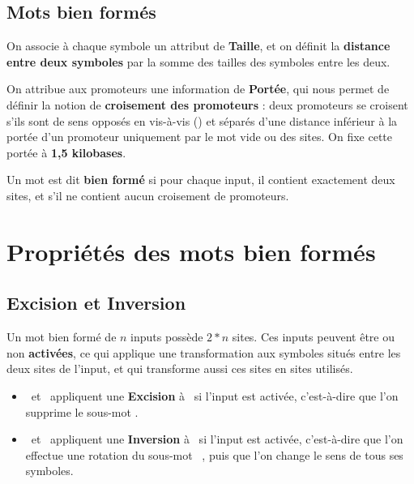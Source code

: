 \subsection{Mots bien formés}
\label{subsec:formalisme/definitions/mots_bien_formes}
\par
On associe à chaque symbole un attribut de \textbf{Taille}, et on définit la \textbf{distance entre deux symboles} par la somme des tailles des symboles entre les deux.\\
\par
On attribue aux promoteurs une information de \textbf{Portée}, qui nous permet de définir la notion de \textbf{croisement des promoteurs} : deux promoteurs se croisent s'ils sont de sens opposés en vis-à-vis (\PF \ANY \PR) et séparés d'une distance inférieur à la portée d'un promoteur uniquement par le mot vide ou des sites. On fixe cette portée à \textbf{1,5 kilobases}.
\par
Un mot est dit \textbf{bien formé} si pour chaque input, il contient exactement deux sites, et s'il ne contient aucun croisement de promoteurs.\\

\section{Propriétés des mots bien formés}
\label{sec:formalisme/proprietes}

\subsection{Excision et Inversion}
\label{subsec:formalisme/proprietes/excision}
\par
Un mot bien formé de $n$ inputs possède $2*n$ sites. Ces inputs peuvent être ou non \textbf{activées}, ce qui applique une transformation aux symboles situés entre les deux sites de l'input, et qui transforme aussi ces sites en sites utilisés.\\

\begin{itemize}
\item {} \ANY {} ~et  \ANY {} ~appliquent une \textbf{Excision} à \ANY ~si l'input est activée, c'est-à-dire que l'on supprime le sous-mot \ANY.\\
\item {} \ANY {} ~et  \ANY {} ~appliquent une \textbf{Inversion} à \ANY ~si l'input est activée, c'est-à-dire que l'on effectue une rotation du sous-mot \ANY~, puis que l'on change le sens de tous ses symboles.\\
\end{itemize}

